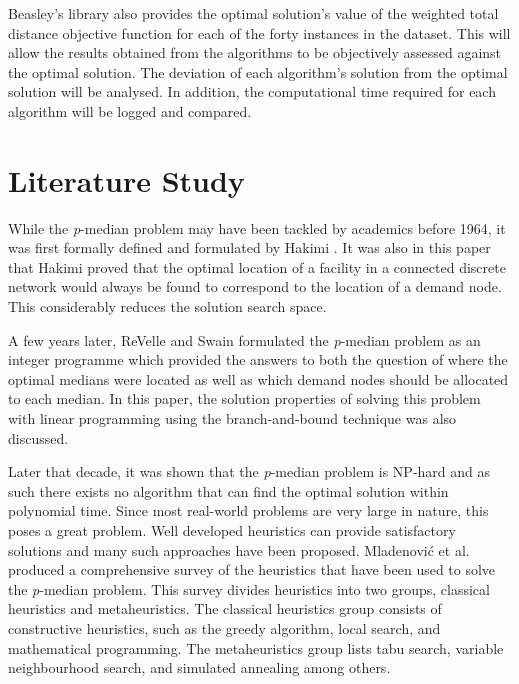 \documentclass[11pt]{article}
\begin{document}
	Beasley's library also provides the optimal solution's value of the weighted total distance objective function for each of the forty instances in the dataset.  This will allow the results obtained from the algorithms to be objectively assessed against the optimal solution.  The deviation of each algorithm's solution from the optimal solution will be analysed.  In addition, the computational time required for each algorithm will be logged and compared.
	

	\section{Literature Study}
	While the \emph{p}-median problem may have been tackled by academics before 1964, it was first formally defined and formulated by Hakimi \cite{HAKI64}.  It was also in this paper that Hakimi proved that the optimal location of a facility in a connected discrete network would always be found to correspond to the location of a demand node.  This considerably reduces the solution search space.
	
	A few years later, ReVelle and Swain \cite{REVE70} formulated the \emph{p}-median problem as an integer programme  which provided the answers to both the question of where the optimal medians were located as well as which demand nodes should be allocated to each median.  In this paper, the solution properties of solving this problem with linear programming  using the branch-and-bound technique  was also discussed.
	
	Later that decade, it was shown that the \emph{p}-median problem is NP-hard  and as such there exists no algorithm that can find the optimal solution within polynomial time.  Since most real-world problems are very large in nature, this poses a great problem.  Well developed heuristics can provide satisfactory solutions and many such approaches have been proposed.  Mladenovi\'{c} et al. \cite{MLAD07} produced a comprehensive survey of the heuristics that have been used to solve the \emph{p}-median problem.  This survey divides heuristics into two groups, classical heuristics and metaheuristics.  The classical heuristics group consists of constructive heuristics, such as the greedy algorithm, local search, and mathematical programming.  The metaheuristics group lists tabu search, variable neighbourhood search, and simulated annealing among others.
	
\end{document}

